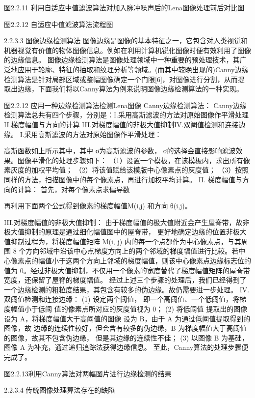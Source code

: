 图2.2.11 利用自适应中值滤波算法对加入脉冲噪声后的Lena图像处理前后对比图

图2.2.12 自适应中值滤波算法流程图

2.2.3.3 图像边缘检测算法
图像边缘是图像的基本特征之一，它包含对人类视觉和机器视觉有价值的物体图像信息。例如在利用计算机锐化图像时便有效利用了图像的边缘信息。 图像边缘检测算法是图像处理领域中一种重要的预处理技术，其广泛地应用于轮廓、特征的抽取和纹理分析等领域。(而其中较晚出现的)Canny边缘检测算法是针对局部区域或整幅图像确定一个门限[6]，对图像进行分割，从而提取出边缘，下面我们将以Canny算法为例来说明图像边缘检测算法的一种实现。

图2.2.12 应用一种边缘检测算法检测Lena图像
Canny边缘检测算法：
Canny边缘检测算法总共有四个步骤，分别是：I.采用高斯滤波的方法对原始图像作平滑处理 II.梯度幅值与方向的计算 III.对梯度幅值的非极大值抑制IV.双阈值检测和连接边缘。
I.采用高斯滤波的方法对原始图像作平滑处理：

高斯函数如上所示其中，其中 σ为高斯滤波的参数， σ的选择会直接影响滤波效果。图像平滑化的处理步骤如下：
（1）设置一个模板，在该模板内，求出所有像素灰度的加权平均值；
（2）将该值赋给该模版中心像素点的灰度值；
（3）按照同样的方法，扫描图像中的每个像素点，再进行加权平均计算。
II. 梯度幅值与方向的计算：
首先，对每个像素点求偏导数

再利用下面两个公式得到像素的梯度幅值M(i,j) 和方向 θ(i,j)。

III.对梯度幅值的非极大值抑制：
由于梯度幅值的极大值附近会产生屋脊带，故非极大值抑制的原理是通过细化幅值图中的屋脊带， 更好地确定边缘的位置非极大值抑制过程为，将梯度幅值矩阵 M(i, j) 内的每一个点都作为中心像素点，与其周围 8 个方向邻域中沿该中心点梯度方向上的两个邻域的梯度幅值进行比较。若中心像素点的幅值小于这两个方向上邻域的梯度幅值，则该中心像素点边缘标志位的值为 0。经过非极大值抑制，不仅用一个像素的宽度替代了梯度幅值矩阵的屋脊带宽度，还保留了屋脊的梯度幅值。
	经过上述三个步骤的处理后，我们已经得到了一个边缘检测的粗粒度结果，其包含有较多的伪边缘。故仍需要进一步处理。
IV.双阈值检测和连接边缘：
(1) 设定两个阈值， 即一个高阈值、一个低阈值，将梯度幅值小于低阈 值的像素点所对应的灰度值视为 0；
(2) 将低阈值 提取出的图像设为 A，将梯度幅值大于高阈值的图像 设为 B，由于 A 为通过低阈值提取得到的图像，故 边缘的连续性较好，但会含有较多的伪边缘，B 为梯度幅值大于高阈值的图像，故其不包含伪边缘， 但是其边缘的连续性不佳；
(3) 以图像 B 为基础， 图像 A 为补充，通过递归追踪法获得边缘信息。
至此，Canny算法的处理步骤便完成了。

图2.2.13利用Canny算法对两幅图片进行边缘检测的结果

2.2.3.4 传统图像处理算法存在的缺陷

